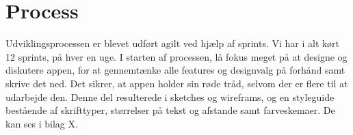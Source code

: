 \section{Process}
Udviklingsprocessen er blevet udført agilt ved hjælp af sprints. Vi har i alt kørt 12 sprints, på hver en uge. I starten af processen, lå fokus meget på at designe og diskutere appen, for at gennemtænke alle features og designvalg på forhånd samt skrive det ned. Det sikrer, at appen holder sin røde tråd, selvom der er flere til at udarbejde den. Denne del resulterede i sketches og wireframs, og en styleguide bestående af skrifttyper, størrelser på tekst og afstande samt farveskemaer. De kan ses i bilag X.


